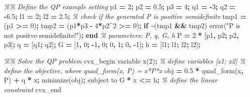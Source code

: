 \documentclass[
]{book}
\newenvironment{Shaded}{\begin{snugshade}}{\end{snugshade}}
\newcommand{\CommentTok}[1]{\textcolor[rgb]{0.56,0.35,0.01}{\textit{#1}}}
\newcommand{\FloatTok}[1]{\textcolor[rgb]{0.00,0.00,0.81}{#1}}
\newcommand{\KeywordTok}[1]{\textcolor[rgb]{0.13,0.29,0.53}{\textbf{#1}}}
\newcommand{\NormalTok}[1]{#1}
\newcommand{\OperatorTok}[1]{\textcolor[rgb]{0.81,0.36,0.00}{\textbf{#1}}}
\newcommand{\StringTok}[1]{\textcolor[rgb]{0.31,0.60,0.02}{#1}}
\newcommand{\VariableTok}[1]{\textcolor[rgb]{0.00,0.00,0.00}{#1}}
\theoremstyle{definition}
\theoremstyle{definition}
\theoremstyle{definition}
\theoremstyle{definition}
\theoremstyle{remark}
\begin{document}
\begin{Shaded}
\begin{Highlighting}[]
\CommentTok{\%\% Define the QP example setting}
\VariableTok{p1} \OperatorTok{=} \FloatTok{2}\OperatorTok{;}
\VariableTok{p2} \OperatorTok{=} \FloatTok{0.5}\OperatorTok{;}
\VariableTok{p3} \OperatorTok{=} \FloatTok{4}\OperatorTok{;}
\VariableTok{q1} \OperatorTok{=} \OperatorTok{{-}}\FloatTok{3}\OperatorTok{;}
\VariableTok{q2} \OperatorTok{=} \OperatorTok{{-}}\FloatTok{6.5}\OperatorTok{;}
\VariableTok{l1} \OperatorTok{=} \FloatTok{2}\OperatorTok{;}
\VariableTok{l2} \OperatorTok{=} \FloatTok{2.5}\OperatorTok{;}
\CommentTok{\% check if the generated P is positive semidefinite}
\VariableTok{tmp1} \OperatorTok{=}\NormalTok{ (}\VariableTok{p1} \OperatorTok{\textgreater{}=} \FloatTok{0}\NormalTok{)}\OperatorTok{;}
\VariableTok{tmp2} \OperatorTok{=}\NormalTok{ (}\VariableTok{p1}\OperatorTok{*}\VariableTok{p3} \OperatorTok{{-}} \FloatTok{4}\OperatorTok{*}\VariableTok{p2}\OperatorTok{\^{}}\FloatTok{2} \OperatorTok{\textgreater{}=} \FloatTok{0}\NormalTok{)}\OperatorTok{;}
\KeywordTok{if} \OperatorTok{\textasciitilde{}}\NormalTok{(}\VariableTok{tmp1} \OperatorTok{\&\&} \VariableTok{tmp2}\NormalTok{)}
    \VariableTok{error}\NormalTok{(}\StringTok{"P is not positve semidefinite!"}\NormalTok{)}\OperatorTok{;}
\KeywordTok{end}
\CommentTok{\% parameters: P, q, G, h}
\VariableTok{P} \OperatorTok{=} \FloatTok{2} \OperatorTok{*}\NormalTok{ [}\VariableTok{p1}\OperatorTok{,} \VariableTok{p2}\OperatorTok{;} \VariableTok{p2}\OperatorTok{,} \VariableTok{p3}\NormalTok{]}\OperatorTok{;}
\VariableTok{q} \OperatorTok{=}\NormalTok{ [}\VariableTok{q1}\OperatorTok{;} \VariableTok{q2}\NormalTok{]}\OperatorTok{;}
\VariableTok{G} \OperatorTok{=}\NormalTok{ [}\FloatTok{1}\OperatorTok{,} \FloatTok{0}\OperatorTok{;} \OperatorTok{{-}}\FloatTok{1}\OperatorTok{,} \FloatTok{0}\OperatorTok{;} \FloatTok{0}\OperatorTok{,} \FloatTok{1}\OperatorTok{;} \FloatTok{0}\OperatorTok{,} \OperatorTok{{-}}\FloatTok{1}\NormalTok{]}\OperatorTok{;}
\VariableTok{h} \OperatorTok{=}\NormalTok{ [}\VariableTok{l1}\OperatorTok{;} \VariableTok{l1}\OperatorTok{;} \VariableTok{l2}\OperatorTok{;} \VariableTok{l2}\NormalTok{]}\OperatorTok{;}

\CommentTok{\%\% Solve the QP problem}
\VariableTok{cvx\_begin}
    \VariableTok{variable} \VariableTok{x}\NormalTok{(}\FloatTok{2}\NormalTok{)}\OperatorTok{;} \CommentTok{\% define variables [x1; x2]}
    \CommentTok{\% define the objective, where quad\_form(x, P) = x\textquotesingle{}*P*x}
    \VariableTok{obj} \OperatorTok{=} \FloatTok{0.5} \OperatorTok{*} \VariableTok{quad\_form}\NormalTok{(}\VariableTok{x}\OperatorTok{,} \VariableTok{P}\NormalTok{) }\OperatorTok{+} \VariableTok{q}\OperatorTok{\textquotesingle{}} \OperatorTok{*} \VariableTok{x}\OperatorTok{;} 
    \VariableTok{minimize}\NormalTok{(}\VariableTok{obj}\NormalTok{)}\OperatorTok{;} 
    \VariableTok{subject} \VariableTok{to}
        \VariableTok{G} \OperatorTok{*} \VariableTok{x} \OperatorTok{\textless{}=} \VariableTok{h}\OperatorTok{;} \CommentTok{\% define the linear constraint}
\VariableTok{cvx\_end}
\end{Highlighting}
\end{Shaded}
\end{document}

